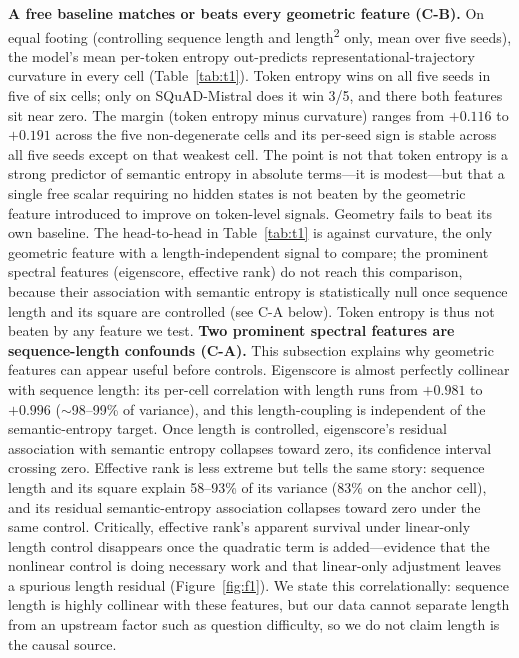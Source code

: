 \documentclass[11pt]{article}
\begin{document}
\textbf{A free baseline matches or beats every geometric feature (C-B).} On equal footing (controlling sequence length and length\textsuperscript{2} only, mean over five seeds), the model's mean per-token entropy out-predicts representational-trajectory curvature in every cell (Table~\ref{tab:t1}). Token entropy wins on all five seeds in five of six cells; only on SQuAD-Mistral does it win 3/5, and there both features sit near zero. The margin (token entropy minus curvature) ranges from $+0.116$ to $+0.191$ across the five non-degenerate cells and its per-seed sign is stable across all five seeds except on that weakest cell. The point is not that token entropy is a strong predictor of semantic entropy in absolute terms---it is modest---but that a single free scalar requiring no hidden states is not beaten by the geometric feature introduced to improve on token-level signals. Geometry fails to beat its own baseline. The head-to-head in Table~\ref{tab:t1} is against curvature, the only geometric feature with a length-independent signal to compare; the prominent spectral features (eigenscore, effective rank) do not reach this comparison, because their association with semantic entropy is statistically null once sequence length and its square are controlled (see C-A below). Token entropy is thus not beaten by any feature we test.
\textbf{Two prominent spectral features are sequence-length confounds (C-A).} This subsection explains why geometric features can appear useful before controls. Eigenscore is almost perfectly collinear with sequence length: its per-cell correlation with length runs from $+0.981$ to $+0.996$ ($\sim$98--99\% of variance), and this length-coupling is independent of the semantic-entropy target. Once length is controlled, eigenscore's residual association with semantic entropy collapses toward zero, its confidence interval crossing zero. Effective rank is less extreme but tells the same story: sequence length and its square explain 58--93\% of its variance (83\% on the anchor cell), and its residual semantic-entropy association collapses toward zero under the same control. Critically, effective rank's apparent survival under linear-only length control disappears once the quadratic term is added---evidence that the nonlinear control is doing necessary work and that linear-only adjustment leaves a spurious length residual (Figure~\ref{fig:f1}). We state this correlationally: sequence length is highly collinear with these features, but our data cannot separate length from an upstream factor such as question difficulty, so we do not claim length is the causal source.
\end{document}
